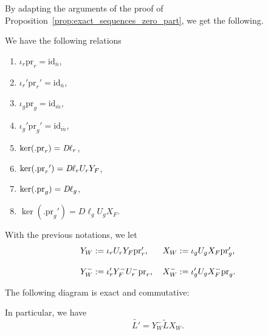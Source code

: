 \documentclass{ifacconf}
\newcommand\id[1]{\text{id}_{#1}}
\newcommand\p{\text{pr}}
\begin{document}
By adapting the arguments of the proof of
Proposition~\ref{prop:exact_sequences_zero_part}, we get the following.
\medskip
\begin{prop}\label{prop:exact_sequences_id_rel_part}
  We have the following relations
  \vspace{-0.4cm}
  \setlength{\columnsep}{-1cm}
  \begin{multicols}{2}
    \begin{enumerate}
    \item\label{it:split_pi_id_rel_part} $\iota_r\p_r=\id{\overline{n}}
      $,
    \item\label{it:split_pip_id_rel_part} ${\iota_r}'{\p_r}'=\id{
      \overline{n}}$,
    \item\label{it:split_pi_id_gen_part} $\iota_g\p_g=\id{\overline{m}}
      $,
    \item\label{it:split_pip_id_gen_part} ${\iota_g}'{\p_g}'=\id{
      \overline{m}}$,
    \item\label{it:ker_pi_id_rel_part} $\ker(.\p_r)=\emph{D}\ell_r$,
    \item\label{it:ker_pip_id_rel_part} $\ker(.{\p_r}')=\emph{D}
      \ell_rU_rY_F$,
    \item\label{it:ker_pi_id_gen_part} $\ker(.\p_g)=\emph{D}\ell_g$,
    \item\label{it:ker_pip_id_gen_part} $\ker(.{\p_g}')=D\ell_gU_gX_F$.
    \end{enumerate}
  \end{multicols}
\end{prop}

\bigskip

\begin{thm}\label{thm:reduction_zero}
  With the previous notations, we let
  \medskip
  \[\begin{tabular}{l l}
  $Y_W:=\iota_r U_rY_F\p'_r$, & $X_W:=\iota_gU_gX_F\p'_g$,
  \\
  & \\
  $Y_W^-:=\iota'_rY_F^-U_r^-\p_r$, &
  $X_W^-:=\iota'_gU_gX_F^-\p_g$.
  \end{tabular}\]
  
  The following diagram is exact and commutative:
  \begin{center}
  \end{center}
  In particular, we have
  \[\tilde{L'}=Y_W^-\tilde{L}X_W.\]
\end{thm}
\end{document}
